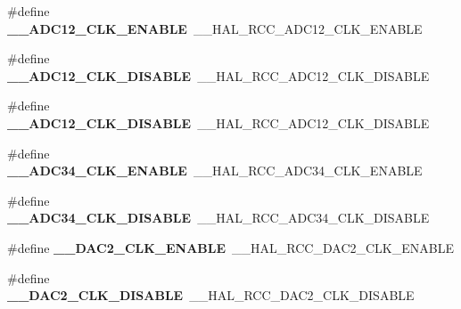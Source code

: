 \begin{DoxyCompactItemize}
\item 
\mbox{\label{group___h_a_l___r_c_c___aliased_ga122c5ade42bf95733284ef8204a4506b}} 
\#define {\bfseries \+\_\+\+\_\+\+A\+D\+C12\+\_\+\+C\+L\+K\+\_\+\+E\+N\+A\+B\+LE}~\+\_\+\+\_\+\+H\+A\+L\+\_\+\+R\+C\+C\+\_\+\+A\+D\+C12\+\_\+\+C\+L\+K\+\_\+\+E\+N\+A\+B\+LE
\item 
\mbox{\label{group___h_a_l___r_c_c___aliased_gabe7e11fce558e2053cdb0ae751126536}} 
\#define {\bfseries \+\_\+\+\_\+\+A\+D\+C12\+\_\+\+C\+L\+K\+\_\+\+D\+I\+S\+A\+B\+LE}~\+\_\+\+\_\+\+H\+A\+L\+\_\+\+R\+C\+C\+\_\+\+A\+D\+C12\+\_\+\+C\+L\+K\+\_\+\+D\+I\+S\+A\+B\+LE
\item 
\mbox{\label{group___h_a_l___r_c_c___aliased_gabe7e11fce558e2053cdb0ae751126536}} 
\#define {\bfseries \+\_\+\+\_\+\+A\+D\+C12\+\_\+\+C\+L\+K\+\_\+\+D\+I\+S\+A\+B\+LE}~\+\_\+\+\_\+\+H\+A\+L\+\_\+\+R\+C\+C\+\_\+\+A\+D\+C12\+\_\+\+C\+L\+K\+\_\+\+D\+I\+S\+A\+B\+LE
\item 
\mbox{\label{group___h_a_l___r_c_c___aliased_gad254ae5b9760ec6cc0b9be3f542b22db}} 
\#define {\bfseries \+\_\+\+\_\+\+A\+D\+C34\+\_\+\+C\+L\+K\+\_\+\+E\+N\+A\+B\+LE}~\+\_\+\+\_\+\+H\+A\+L\+\_\+\+R\+C\+C\+\_\+\+A\+D\+C34\+\_\+\+C\+L\+K\+\_\+\+E\+N\+A\+B\+LE
\item 
\mbox{\label{group___h_a_l___r_c_c___aliased_ga7d658c3accc90e210938a08bb313a6be}} 
\#define {\bfseries \+\_\+\+\_\+\+A\+D\+C34\+\_\+\+C\+L\+K\+\_\+\+D\+I\+S\+A\+B\+LE}~\+\_\+\+\_\+\+H\+A\+L\+\_\+\+R\+C\+C\+\_\+\+A\+D\+C34\+\_\+\+C\+L\+K\+\_\+\+D\+I\+S\+A\+B\+LE
\item 
\mbox{\label{group___h_a_l___r_c_c___aliased_gae4c367c2fb13b1c443b9c2ead24c2589}} 
\#define {\bfseries \+\_\+\+\_\+\+D\+A\+C2\+\_\+\+C\+L\+K\+\_\+\+E\+N\+A\+B\+LE}~\+\_\+\+\_\+\+H\+A\+L\+\_\+\+R\+C\+C\+\_\+\+D\+A\+C2\+\_\+\+C\+L\+K\+\_\+\+E\+N\+A\+B\+LE
\item 
\mbox{\label{group___h_a_l___r_c_c___aliased_gacfc9ef4fb5d3565351542b14e6d7830e}} 
\#define {\bfseries \+\_\+\+\_\+\+D\+A\+C2\+\_\+\+C\+L\+K\+\_\+\+D\+I\+S\+A\+B\+LE}~\+\_\+\+\_\+\+H\+A\+L\+\_\+\+R\+C\+C\+\_\+\+D\+A\+C2\+\_\+\+C\+L\+K\+\_\+\+D\+I\+S\+A\+B\+LE

\end{DoxyCompactItemize}
